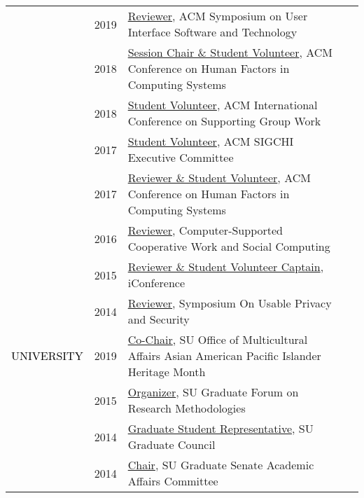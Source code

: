 \documentclass[12pt]{article}
\begin{document}
{{\begin{longtable}{Rp{1.0in}p{0.25in}p{4.75in}}
& \footnotesize{2019} & \href{http://uist.acm.org/uist2019/}{{Reviewer}}, ACM Symposium on User Interface Software and Technology \\

& \footnotesize{2018} & \href{https://chi2018.acm.org}{{Session Chair \& Student Volunteer}}, ACM Conference on Human Factors in Computing Systems \\

& \footnotesize{2018} & \href{https://group.acm.org/conferences/group18/index.html}{{Student Volunteer}}, ACM International Conference on Supporting Group Work \\

& \footnotesize{2017} & \href{https://sigchi.org/}{{Student Volunteer}}, ACM SIGCHI Executive Committee \\

& \footnotesize{2017} & \href{https://chi2017.acm.org/}{{Reviewer \& Student Volunteer}}, ACM Conference on Human Factors in Computing Systems \\

& \footnotesize{2016} & \href{https://cscw.acm.org/}{{Reviewer}}, Computer-Supported Cooperative Work and Social Computing \\

& \footnotesize{2015} & \href{https://ischools.org/the-iconference/}{{Reviewer \& Student Volunteer Captain}}, iConference \\

& \footnotesize{2014} & \href{https://www.usenix.org/sites/default/files/soups14_proceedings.pdf}{{Reviewer}}, Symposium On Usable Privacy and Security \\

\textcolor{black}{\footnotesize{\uppercase{University}}} & \footnotesize{2019} & \href{http://dailyorange.com/2019/04/su-alum-deliver-lecture-industry-experience-cultural-identity-aapi-month/}{{Co-Chair}}, SU Office of Multicultural Affairs Asian American Pacific Islander Heritage Month \\

& \footnotesize{2015} & \href{http://gradresearch.syr.edu}{{Organizer}}, SU Graduate Forum on Research Methodologies \\

& \footnotesize{2014} & \href{http://gradorg.syr.edu/senate/committees/}{{Graduate Student Representative}}, SU Graduate Council \\

& \footnotesize{2014} & \href{http://gradorg.syr.edu/senate/committees/}{{Chair}}, SU Graduate Senate Academic Affairs Committee \\


\end{longtable}}}
\end{document}
